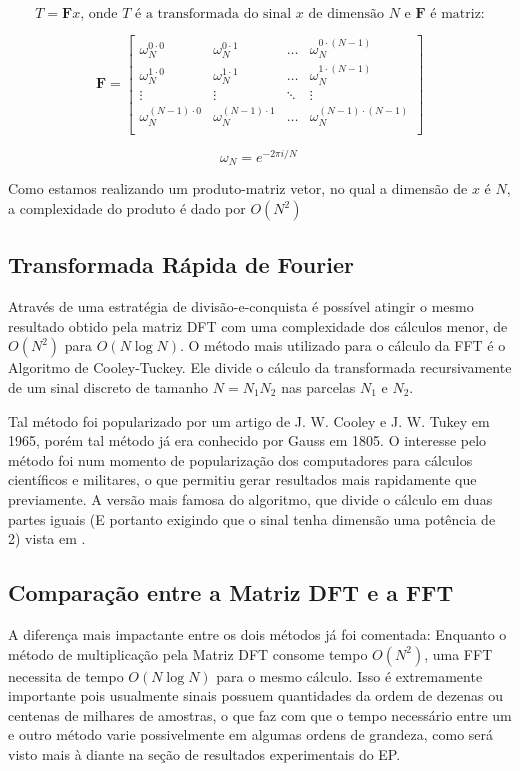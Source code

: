 \documentclass[brazil,times]{abnt}
\begin{document}
		$$T = \mathbf{F}x \text{, onde $T$ é a transformada do sinal $x$ de dimensão $N$ e $\mathbf{F}$ é matriz:}$$



		$$
		\mathbf{F} =
		\begin{bmatrix}
			\omega_N^{0 \cdot 0}     & \omega_N^{0 \cdot 1}     & \ldots & \omega_N^{0 \cdot (N-1)}     \\
			\omega_N^{1 \cdot 0}     & \omega_N^{1 \cdot 1}     & \ldots & \omega_N^{1 \cdot (N-1)}     \\
			\vdots                   & \vdots                   & \ddots & \vdots                       \\
			\omega_N^{(N-1) \cdot 0} & \omega_N^{(N-1) \cdot 1} & \ldots & \omega_N^{(N-1) \cdot (N-1)} \\
		\end{bmatrix}
		$$

		$$\omega_N = e^{-2 \pi i/N}\,$$


		Como estamos realizando um produto-matriz vetor, no qual a dimensão de $x$ é $N$, a complexidade do produto é dado por $O(N^2)$

	\subsection*{Transformada Rápida de Fourier}
		Através de uma estratégia de divisão-e-conquista é possível atingir o mesmo resultado obtido pela matriz DFT com uma complexidade dos cálculos menor, de $O(N^2)$ para $O(N\log{N})$. O método mais utilizado para o cálculo da FFT é o Algoritmo de Cooley-Tuckey. Ele divide o cálculo da transformada recursivamente de um sinal discreto de tamanho $N = N_1 N_2$ nas parcelas $N_1$ e $N_2$.
		
		Tal método foi popularizado por um artigo de J. W. Cooley e J. W. Tukey em 1965, porém tal método já era conhecido por Gauss em 1805. O interesse pelo método foi num momento de popularização dos computadores para cálculos científicos e militares, o que permitiu gerar resultados mais rapidamente que previamente. A versão mais famosa do algoritmo, que divide o cálculo em duas partes iguais (E portanto exigindo que o sinal tenha dimensão uma potência de 2) vista em \cite{wiki:cooley-tukey}.


	\subsection*{Comparação entre a Matriz DFT e a FFT}
		A diferença mais impactante entre os dois métodos já foi comentada: Enquanto o método de multiplicação pela Matriz DFT consome tempo $O(N^2)$, uma FFT necessita de tempo $O(N\log{N})$ para o mesmo cálculo. Isso é extremamente importante pois usualmente sinais possuem quantidades da ordem de dezenas ou centenas de milhares de amostras, o que faz com que o tempo necessário entre um e outro método varie possivelmente em algumas ordens de grandeza, como será visto mais à diante na seção de resultados experimentais do EP.
	
\end{document}
